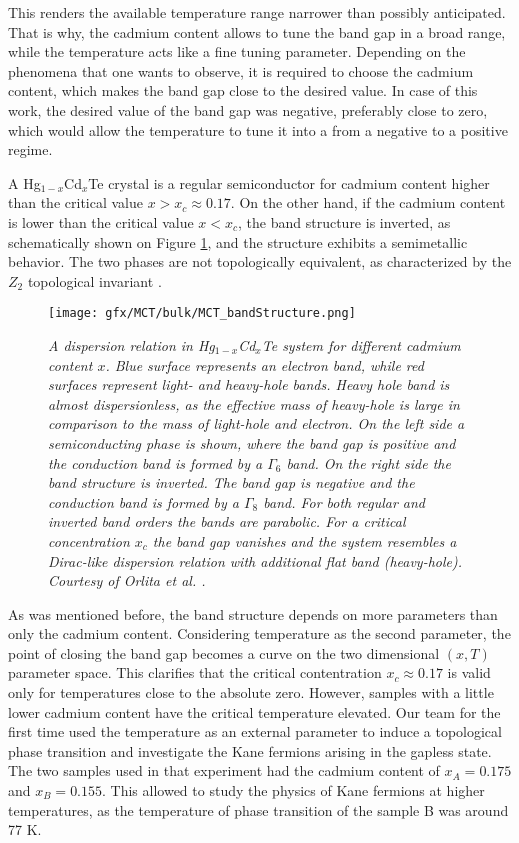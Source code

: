 \documentclass[titlepage,a4paper]{book}
\begin{document}
This renders the available temperature range narrower than possibly anticipated. That is why, the cadmium content allows to tune the band gap in a broad range, while the temperature acts like a fine tuning parameter. Depending on the phenomena that one wants to observe, it is required to choose the cadmium content, which makes the band gap close to the desired value. In case of this work, the desired value of the band gap was negative, preferably close to zero, which would allow the temperature to tune it into a from a negative to a positive regime. 

A Hg$_{1-x}$Cd$_x$Te crystal is a regular semiconductor for cadmium content higher than the critical value $x > x_c \approx 0.17$. On the other hand, if the cadmium content is lower than the critical value $x < x_c$, the band structure is inverted, as schematically shown on Figure \ref{fig:MCT_bandStructure}, and the structure exhibits a semimetallic behavior. The two phases are not topologically equivalent, as characterized by the $Z_2$ topological invariant \cite{Bernevig_Topology2}.

\begin{figure}[ht]
	\centering
	\texttt{[image: gfx/MCT/bulk/MCT\_bandStructure.png]}
	\vspace{-10pt}
	\caption{\textit{A dispersion relation in Hg$_{1-x}$Cd$_x$Te system for different cadmium content $x$. Blue surface represents an electron band, while red surfaces represent light- and heavy-hole bands. Heavy hole band is almost dispersionless, as the effective mass of heavy-hole is large in comparison to the mass of light-hole and electron. On the left side a semiconducting phase is shown, where the band gap is positive and the conduction band is formed by a $\Gamma_6$ band. On the right side the band structure is inverted. The band gap is negative and the conduction band is formed by a $\Gamma_8$ band. For both regular and inverted band orders the bands are parabolic. For a critical concentration $x_c$ the band gap vanishes and the system resembles a Dirac-like dispersion relation with additional flat band (heavy-hole). Courtesy of Orlita \textit{et al.} \cite{Orlita_MCT}.}}
	\label{fig:MCT_bandStructure}
\end{figure} 

As was mentioned before, the band structure depends on more parameters than only the cadmium content. Considering temperature as the second parameter, the point of closing the band gap becomes a curve on the two dimensional $(x, T)$ parameter space. This clarifies that the critical contentration $x_c \approx 0.17$ is valid only for temperatures close to the absolute zero. However, samples with a little lower cadmium content have the critical temperature elevated. Our team \cite{Teppe_MCT} for the first time used the temperature as an external parameter to induce a topological phase transition and investigate the Kane fermions arising in the gapless state. The two samples used in that experiment had the cadmium content of $x_A = 0.175$ and $x_B = 0.155$. This allowed to study the physics of Kane fermions at higher temperatures, as the temperature of phase transition of the sample B was around 77 K.  
\end{document}
